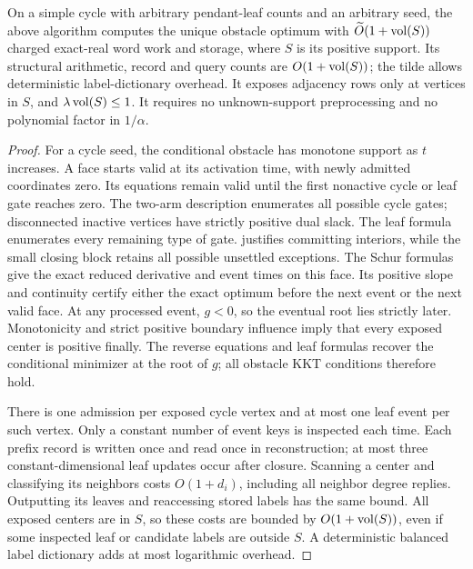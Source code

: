 \begin{theorem}
\label{thm:op3-local-cycle}
On a simple cycle with arbitrary pendant-leaf counts and an arbitrary
seed, the above algorithm computes the unique obstacle optimum with
$\widetilde O(1+\operatorname{vol}(S))$ charged exact-real word work and storage, where
$S$ is its positive support. Its structural arithmetic, record and query
counts are $O(1+\operatorname{vol}(S))$; the tilde allows deterministic label-dictionary
overhead. It exposes adjacency rows only at vertices in $S$, and
$\lambda\operatorname{vol}(S)\leq1$. It requires no unknown-support preprocessing and
no polynomial factor in $1/\alpha$.
\end{theorem}
\begin{proof}
For a cycle seed, the conditional obstacle has monotone support as $t$
increases. A face starts valid at its activation time, with newly admitted
coordinates zero. Its equations remain valid until the first nonactive
cycle or leaf gate reaches zero. The two-arm description enumerates all
possible cycle gates; disconnected inactive vertices have strictly positive
dual slack. The leaf formula enumerates every remaining type of gate.
 justifies committing interiors, while the
small closing block retains all possible unsettled exceptions. The Schur
formulas give the exact reduced derivative and event times on this face.
Its positive slope and continuity certify either the exact optimum before
the next event or the next valid face. At any processed event, $g<0$, so
the eventual root lies strictly later. Monotonicity and strict positive
boundary influence imply that every exposed center is positive finally.
The reverse equations and leaf formulas recover the conditional minimizer
at the root of $g$; all obstacle KKT conditions therefore hold.

There is one admission per exposed cycle vertex and at most one leaf event
per such vertex. Only a constant number of event keys is inspected each
time. Each prefix record is written once and read once in reconstruction;
at most three constant-dimensional leaf updates occur after closure.
Scanning a center and classifying its neighbors costs $O(1+d_i)$, including
all neighbor degree replies. Outputting its leaves and reaccessing stored
labels has the same bound. All exposed centers are in $S$, so these costs
are bounded by $O(1+\operatorname{vol}(S))$, even if some inspected leaf or candidate
labels are outside $S$. A deterministic balanced label dictionary adds at
most logarithmic overhead.


\end{proof}
